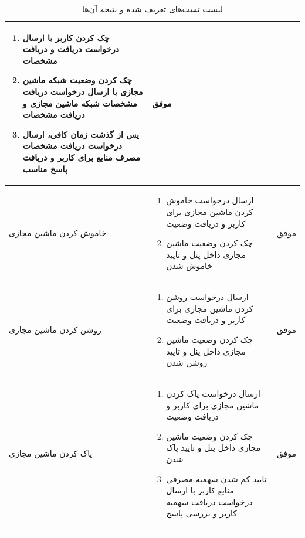 \begin{center}
\begin{longtable}{ | P{2cm} | P{11cm} | c | }
{\begin{enumerate}[rightmargin=1cm,topsep=0pt,partopsep=0pt]
		\item چک کردن  کاربر با ارسال درخواست دریافت  و دریافت مشخصات
		
		\item چک کردن وضعیت شبکه ماشین مجازی با ارسال درخواست دریافت مشخصات شبکه ماشین مجازی و دریافت مشخصات
		
		\item پس از گذشت زمان کافی، ارسال درخواست دریافت مشخصات مصرف منابع برای کاربر و دریافت پاسخ مناسب
	\end{enumerate}
} &
موفق \\ \hline

 خاموش کردن ماشین مجازی&
{\footnotesize
	\begin{enumerate}[rightmargin=1cm,topsep=0pt,partopsep=0pt]
		\item ارسال درخواست خاموش کردن ماشین مجازی برای کاربر و دریافت وضعیت 
		
		\item چک کردن وضعیت ماشین مجازی داخل پنل  و تایید خاموش شدن
	\end{enumerate}
} &
موفق \\ \hline


روشن کردن ماشین مجازی&
{\footnotesize
	\begin{enumerate}[rightmargin=1cm,topsep=0pt,partopsep=0pt]
		\item ارسال درخواست روشن کردن ماشین مجازی برای کاربر و دریافت وضعیت 
		
		\item چک کردن وضعیت ماشین مجازی داخل پنل  و تایید روشن شدن
	\end{enumerate}
} &
موفق \\ \hline


پاک کردن ماشین مجازی&
{\footnotesize
	\begin{enumerate}[rightmargin=1cm,topsep=0pt,partopsep=0pt]
		\item ارسال درخواست پاک کردن ماشین مجازی برای کاربر و دریافت وضعیت 
		
		\item چک کردن وضعیت ماشین مجازی داخل پنل  و تایید پاک شدن
		
		\item تایید کم شدن سهمیه مصرفی منابع کاربر با ارسال درخواست دریافت سهمیه کاربر و بررسی پاسخ
	\end{enumerate}
} &
موفق \\ \hline
\caption{لیست تست‌های تعریف شده و نتیجه آن‌ها}
\end{longtable}
\end{center}

